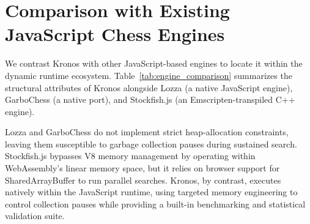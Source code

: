 \section{Comparison with Existing JavaScript Chess Engines}
We contrast Kronos with other JavaScript-based engines to locate it within the dynamic runtime ecosystem. Table~\ref{tab:engine_comparison} summarizes the structural attributes of Kronos alongside Lozza (a native JavaScript engine), GarboChess (a native port), and Stockfish.js (an Emscripten-transpiled C++ engine).



Lozza and GarboChess do not implement strict heap-allocation constraints, leaving them susceptible to garbage collection pauses during sustained search. Stockfish.js bypasses V8 memory management by operating within WebAssembly's linear memory space, but it relies on browser support for SharedArrayBuffer to run parallel searches. Kronos, by contrast, executes natively within the JavaScript runtime, using targeted memory engineering to control collection pauses while providing a built-in benchmarking and statistical validation suite.



